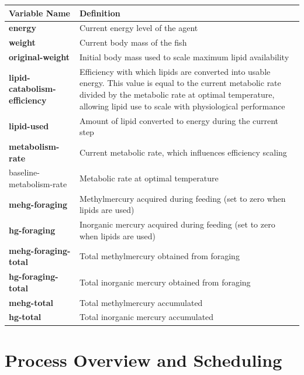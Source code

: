 \documentclass[
]{book}
\begin{document}
\begin{longtable}[]{@{}
  >{\raggedright\arraybackslash}p{}
  >{\raggedright\arraybackslash}p{}@{}}
\toprule\noalign{}
\begin{minipage}[b]{\linewidth}\raggedright
Variable Name
\end{minipage} & \begin{minipage}[b]{\linewidth}\raggedright
Definition
\end{minipage} \\
\midrule\noalign{}
\endhead
\bottomrule\noalign{}
\endlastfoot
\textbf{energy} & Current energy level of the agent \\
\textbf{weight} & Current body mass of the fish \\
\textbf{original-weight} & Initial body mass used to scale maximum lipid availability \\
\textbf{lipid-catabolism-efficiency} & Efficiency with which lipids are converted into usable energy. This value is equal to the current metabolic rate divided by the metabolic rate at optimal temperature, allowing lipid use to scale with physiological performance \\
\textbf{lipid-used} & Amount of lipid converted to energy during the current step \\
\textbf{metabolism-rate} & Current metabolic rate, which influences efficiency scaling \\
baseline-metabolism-rate & Metabolic rate at optimal temperature \\
\textbf{mehg-foraging} & Methylmercury acquired during feeding (set to zero when lipids are used) \\
\textbf{hg-foraging} & Inorganic mercury acquired during feeding (set to zero when lipids are used) \\
\textbf{mehg-foraging-total} & Total methylmercury obtained from foraging \\
\textbf{hg-foraging-total} & Total inorganic mercury obtained from foraging \\
\textbf{mehg-total} & Total methylmercury accumulated \\
\textbf{hg-total} & Total inorganic mercury accumulated \\
\end{longtable}

\section{Process Overview and Scheduling}\label{process-overview-and-scheduling-6}
\end{document}
